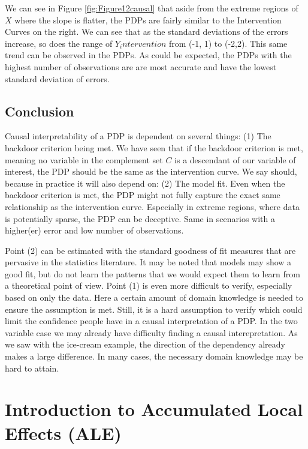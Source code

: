 \documentclass[]{krantz}
\begin{document}
We can see in Figure \ref{fig:Figure12causal} that aside from the
extreme regions of \(X\) where the slope is flatter, the PDPs are fairly
similar to the Intervention Curves on the right. We can see that as the
standard deviations of the errors increase, so does the range of
\(Y_intervention\) from (-1, 1) to (-2,2). This same trend can be
observed in the PDPs. As could be expected, the PDPs with the highest
number of observations are are most accurate and have the lowest
standard deviation of errors.

\section{Conclusion}\label{conclusion}

Causal interpretability of a PDP is dependent on several things: (1) The
backdoor criterion being met. We have seen that if the backdoor
criterion is met, meaning no variable in the complement set \(C\) is a
descendant of our variable of interest, the PDP should be the same as
the intervention curve. We say should, because in practice it will also
depend on: (2) The model fit. Even when the backdoor criterion is met,
the PDP might not fully capture the exact same relationship as the
intervention curve. Especially in extreme regions, where data is
potentially sparse, the PDP can be deceptive. Same in scenarios with a
higher(er) error and low number of observations.

Point (2) can be estimated with the standard goodness of fit measures
that are pervasive in the statistics literature. It may be noted that
models may show a good fit, but do not learn the patterns that we would
expect them to learn from a theoretical point of view. Point (1) is even
more difficult to verify, especially based on only the data. Here a
certain amount of domain knowledge is needed to ensure the assumption is
met. Still, it is a hard assumption to verify which could limit the
confidence people have in a causal interpretation of a PDP. In the two
variable case we may already have difficulty finding a causal
interepretation. As we saw with the ice-cream example, the direction of
the dependency already makes a large difference. In many cases, the
necessary domain knowledge may be hard to attain.

\chapter{Introduction to Accumulated Local Effects (ALE)}\label{ale}
\end{document}
